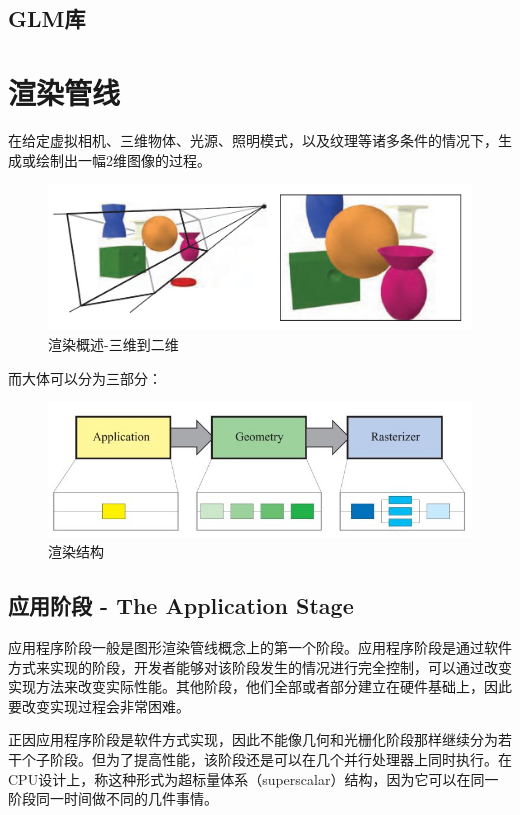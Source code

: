 \documentclass[UTF8,a4paper,12pt]{ctexbook}
\begin{document}
	\section{GLM库}
	
	
	
	
	
\chapter{渲染管线}
	在给定虚拟相机、三维物体、光源、照明模式，以及纹理等诸多条件的情况下，生成或绘制出一幅2维图像的过程。
		\begin{figure}[H]
			\centering
			\includegraphics[scale=0.5]{Outline}
			\caption{渲染概述-三维到二维}
		\end{figure}
		
		而大体可以分为三部分：
		
		\begin{figure}[H]
			\centering
			\includegraphics[scale=0.7]{Outline2}
			\caption{渲染结构}
		\end{figure}
		
	\section{应用阶段 - The Application Stage}
		应用程序阶段一般是图形渲染管线概念上的第一个阶段。应用程序阶段是通过软件方式来实现的阶段，开发者能够对该阶段发生的情况进行完全控制，可以通过改变实现方法来改变实际性能。其他阶段，他们全部或者部分建立在硬件基础上，因此要改变实现过程会非常困难。
		
		正因应用程序阶段是软件方式实现，因此不能像几何和光栅化阶段那样继续分为若干个子阶段。但为了提高性能，该阶段还是可以在几个并行处理器上同时执行。在CPU设计上，称这种形式为超标量体系（superscalar）结构，因为它可以在同一阶段同一时间做不同的几件事情。
		
\end{document}
